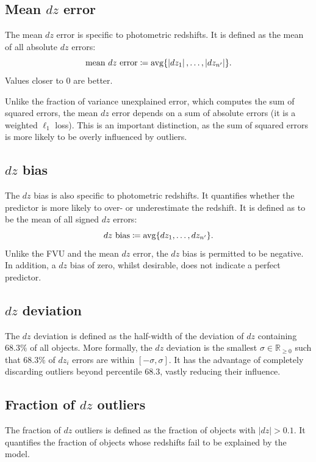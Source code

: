 \documentclass[11pt,twoside,openright]{report}
\newcommand\bbR{\mathbb{R}}
\newcommand\abs[1]{\left|#1\right|}
\DeclareMathOperator{\avg}{avg}
\begin{document}
\subsection{Mean $dz$ error}
The mean $dz$ error is specific to photometric redshifts. It is defined as the mean of all absolute $dz$ errors:\[
  \textrm{mean $dz$ error} \coloneqq \avg\{\abs{dz_1}, \dots, \abs{dz_{n'}}\} \text.
\] Values closer to $0$ are better.

Unlike the fraction of variance unexplained error, which computes the sum of squared errors, the mean $dz$ error depends on a sum of absolute errors (it is a weighted $\ell_1$ loss). This is an important distinction, as the sum of squared errors is more likely to be overly influenced by outliers.

\subsection{$dz$ bias}

The $dz$ bias is also specific to photometric redshifts. It quantifies whether the predictor is more likely to over- or underestimate the redshift. It is defined as to be the mean of all signed $dz$ errors:\[
  \textrm{$dz$ bias} \coloneqq \avg\{ dz_1, \dots, dz_{n'} \} \text.
\] Unlike the FVU and the mean $dz$ error, the $dz$ bias is permitted to be negative. In addition, a $dz$ bias of zero, whilst desirable, does not indicate a perfect predictor.

\subsection{$dz$ deviation}

The $dz$ deviation is defined as the half-width of the deviation of $dz$ containing $68.3\%$ of all objects. More formally, the $dz$ deviation is the smallest $\sigma \in \bbR_{\geq0}$ such that $68.3\%$ of $dz_i$ errors are within $[-\sigma, \sigma]$. It has the advantage of completely discarding outliers beyond percentile $68.3$, vastly reducing their influence.

\subsection{Fraction of $dz$ outliers}

The fraction of $dz$ outliers is defined as the fraction of objects with $\abs{dz} > 0.1$. It quantifies the fraction of objects whose redshifts fail to be explained by the model.
\end{document}
